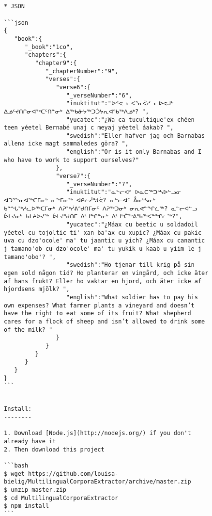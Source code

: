 \documentclass[12pt]{article}
\begin{document}
\begin{figure}
\begin{verbatim}


* JSON

```json
{
   "book":{
      "_book":"1co",
      "chapters":{
         "chapter9":{
            "_chapterNumber":"9",
            "verses":{
               "verse6":{
                  "_verseNumber":"6",
                  "inuktitut":"ᐅᕝᕙᓘ ᐸᕐᓇᐹᓯᓗ ᐅᕙᒍᒃ ᐃᓅᑦᔪᑎᒋᓂᐊᖅᑕᑦᑎᓐᓂᒃ ᐃᖅᑲᓁᔭᖅᑐᑑᔭᕆᐊᖃᖅᐱᓅᒃ? ",
                  "yucatec":"¿Wa ca tucultique'ex chéen teen yéetel Bernabé unaj c meyaj yéetel áakab? ",
                  "swedish":"Eller hafver jag och Barnabas allena icke magt sammaledes göra? ",
                  "english":"Or is it only Barnabas and I who have to work to support ourselves?"
               },
               "verse7":{
                  "_verseNumber":"7",
                  "inuktitut":"ᓇᓪᓕᐊᑦ ᐅᓇᑕᖅᑐᒃᓴᐅᓪᓗᓂ ᐊᑐᕐᖕᓂᐊᖅᑕᒥᓂᒃ ᓇᖕᒥᓂᖅ ᐊᑭᓖᓲᖑᕚ? ᓇᓪᓕᐊᑦ ᕔᓂᒃᓴᓂᒃ ᑲᓐᖓᖅᓱᓚᐅᖅᑕᒥᓂᒃ ᐱᕈᖅᓰᕕᖁᑎᒥᓂᑦ ᐱᕈᖅᑐᓂᒃ ᓂᕆᕙᓐᖏᓛᖅ? ᓇᓪᓕᐊᓪᓗ ᐆᒪᔪᓂᒃ ᑲᒪᔨᐅᔪᖅ ᐆᒪᔪᖁᑎᒥ ᐃᒻᒧᖏᓐᓂᒃ ᐃᒻᒧᒃᑖᖅᕕᖃᖅᐸᓐᖏᓛᖅ?",
                  "yucatec":"¿Máax cu beetic u soldadoil yéetel cu tojoltic ti' xan ba'ax cu xupic? ¿Máax cu pakic uva cu dzo'ocole' ma' tu jaantic u yich? ¿Máax cu canantic j tamano'ob cu dzo'ocole' ma' tu yukik u kaab u yiim le j tamano'obo'? ",
                  "swedish":"Ho tjenar till krig på sin egen sold någon tid? Ho planterar en vingård, och icke äter af hans frukt? Eller ho vaktar en hjord, och äter icke af hjordsens mjölk? ",
                  "english":"What soldier has to pay his own expenses? What farmer plants a vineyard and doesn’t have the right to eat some of its fruit? What shepherd cares for a flock of sheep and isn’t allowed to drink some of the milk? "
               }
            }
         }
      }
   }
}
```

\end{verbatim}
\end{figure}

\begin{figure}
\begin{verbatim}

Install:
--------

1. Download [Node.js](http://nodejs.org/) if you don't already have it
2. Then download this project

```bash
$ wget https://github.com/louisa-bielig/MultilingualCorporaExtractor/archive/master.zip
$ unzip master.zip
$ cd MultilingualCorporaExtractor
$ npm install 
```
\end{verbatim}
\end{figure}
\end{document}
